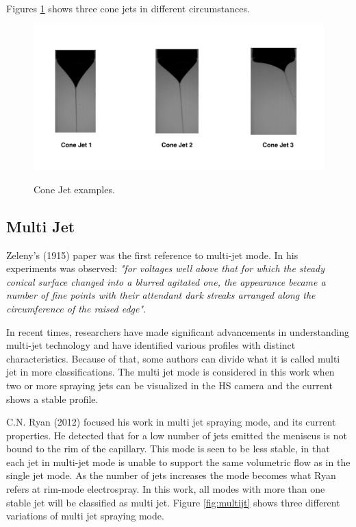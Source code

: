 Figures \ref{fig:conjt} shows three cone jets in different circumstances.

  \begin{figure}[H]
      \center
      \includegraphics[width=15cm]{Figuras/april/conjet.png}
      \label{fig:conjt}
      \caption{Cone Jet examples.}
  \end{figure}


\subsection{Multi Jet}
\label{subsec:Multi Jet}

Zeleny's (1915)\cite{zeleny} paper was the first reference to multi-jet mode. In his experiments was observed:
\emph{"for voltages well above that for which the steady conical surface changed into a blurred agitated one, the appearance became a number of fine points with their attendant dark streaks arranged along the circumference of the raised edge".}

In recent times, researchers have made significant advancements in understanding multi-jet technology and have identified various profiles with distinct characteristics. Because of that, some authors can divide what it is called multi jet in more classifications.
The multi jet mode is considered in this work when two or more spraying jets can be visualized in the HS camera and the current shows a stable profile. 

C.N. Ryan (2012)\cite{Ryan} focused his work in multi jet spraying mode, and its current properties. 
He detected that for a low number of jets emitted the meniscus is not bound to the rim of the capillary. 
This mode is seen to be less stable, in that each jet in multi-jet mode is unable to support the same volumetric flow as in the single jet mode.
As the number of jets increases the mode becomes what Ryan refers at rim-mode electrospray. 
In this work, all modes with more than one stable jet will be classified as multi jet. Figure \ref{fig:multijt} shows three different variations of multi jet spraying mode.


